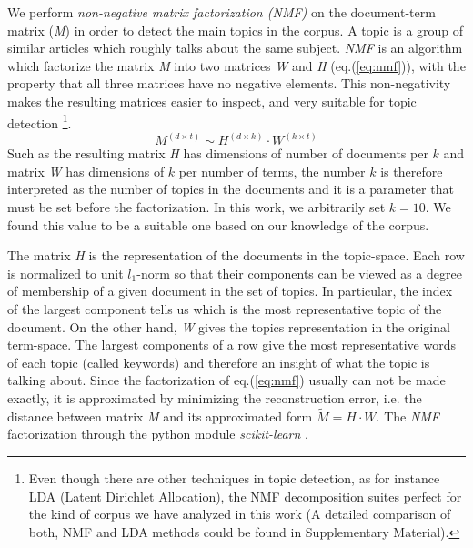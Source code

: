 \documentclass{bmcart}
\begin{document}
\par We perform \emph{non-negative matrix factorization (NMF)} \cite{xu2003document, lee1999learning} on the document-term matrix (\emph{M}) in order to detect the main topics in the corpus. A topic is a group of similar articles which roughly talks about the same subject. 
\emph{NMF} is an algorithm which factorize the matrix \emph{M} into two matrices \emph{W} and \emph{H} (eq.(\ref{eq:nmf})), with the property that all three matrices have no negative elements. This non-negativity makes the resulting matrices easier to inspect, and very suitable for topic detection \footnote{ Even though there are other techniques in topic detection, as for instance LDA (Latent Dirichlet Allocation), the NMF decomposition suites perfect for the kind of corpus we  have analyzed in this work (A detailed comparison of both, NMF and LDA methods could be found in Supplementary Material).}. 
\begin{equation}
M^{(d \times t)} \sim H^{(d \times k)} \cdot W^{(k \times t)}
\label{eq:nmf}
\end{equation}
Such as the resulting matrix \emph{H} has dimensions of number of documents per $k$ and matrix \emph{W} has dimensions of $k$ per number of terms, the number $k$ is therefore interpreted as the number of topics in the documents and it is a parameter that must be set before the factorization.
In this work, we arbitrarily set $k=10$. We found this value to be a suitable one based on our knowledge of the corpus.
\par The matrix \emph{H} is the representation of the documents in the topic-space. Each row is normalized to unit $l_1$-norm so that their components can be viewed as a degree of membership of a given document in the set of topics. In particular, the index of the largest component tells us which is the most representative topic of the document.
On the other hand, \emph{W} gives the topics representation in the original term-space. The largest components of a row give the most representative words of each topic (called keywords) and therefore an insight of what the topic is talking about.
Since the factorization of eq.(\ref{eq:nmf}) usually can not be made exactly, it is approximated by minimizing the reconstruction error, i.e. the distance between matrix \emph{M} and its approximated form $\tilde{M} = H \cdot W$. The \emph{NMF} factorization through the python module \emph{scikit-learn} \cite{scikit-learn}.
\end{document}
